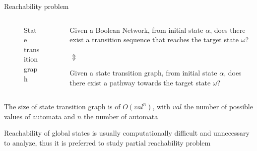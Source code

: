 \documentclass[8pt]{beamer}
\begin{document}
\begin{frame}{Reachability problem}
\begin{columns}
	\begin{column}{.5\textwidth}
	\begin{figure}
    \caption{State transition graph} 
    \end{figure}
    \end{column}
    \begin{column}{.5\textwidth}
    Given a Boolean Network, from initial state $\alpha$, does there exist a transition sequence that reaches the target state $\omega$?

    \vspace{0.25cm}
{\centering $\Updownarrow$

}
    
    
    \vspace{0.25cm}
   
   
    Given a state transition graph, from initial state $\alpha$, does there exist a pathway towards the target state $\omega$?
    \end{column}
\end{columns}

\vspace{0.1cm}

The size of state transition graph is of $O(val^n)$, with $val$ the number of possible values of automata and $n$ the number of automata

\vspace{0.1cm}

Reachability of global states  is usually computationally difficult and unnecessary to analyze, thus it is preferred to study partial reachability problem 

\end{frame}
\end{document}
